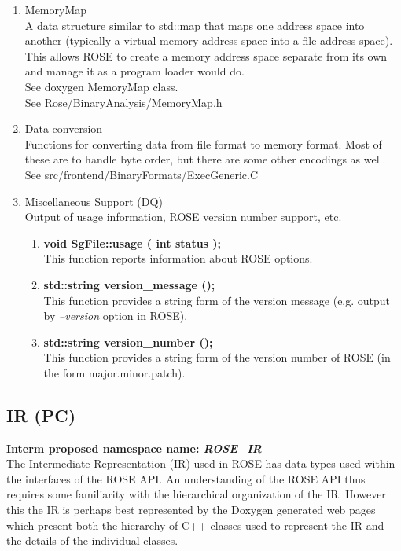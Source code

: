 \begin{enumerate}
   \item MemoryMap \\
   A data structure similar to std::map that maps one address
   space into another (typically a virtual memory address space
   into a file address space).  This allows ROSE to create a
   memory address space separate from its own and manage it as a
   program loader would do. \\
   See doxygen MemoryMap class. \\
   See Rose/BinaryAnalysis/MemoryMap.h

   \item Data conversion \\
   Functions for converting data from file format to memory
   format. Most of these are to handle byte order, but there are
   some other encodings as well. \\
   See src/frontend/BinaryFormats/ExecGeneric.C

   \item Miscellaneous Support (DQ) \\
         Output of usage information, ROSE version number support, etc.
   \begin{enumerate}
      \item {\bf void SgFile::usage ( int status );} \\
      This function reports information about ROSE options.
      \item {\bf std::string version\_message ();} \\
      This function provides a string form of the version message 
      (e.g. output by {\em --version} option in ROSE).
      \item {\bf std::string version\_number ();} \\
      This function provides a string form of the version number of ROSE
      (in the form major.minor.patch).
   \end{enumerate}

\end{enumerate}


\subsection{IR (PC)}
{\bf Interm proposed namespace name: {\em ROSE\_IR}} \\
   The Intermediate Representation (IR) used in ROSE has data types used
within the interfaces of the ROSE API.  An understanding of the ROSE API 
thus requires some familiarity with the hierarchical organization of the 
IR.  However this the IR is perhaps best represented by the Doxygen
generated web pages which present both the hierarchy of C++ classes 
used to represent the IR and the details of the individual classes.

